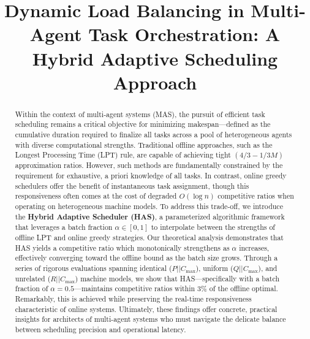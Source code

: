\documentclass[conference]{IEEEtran}
\begin{document}
\title{Dynamic Load Balancing in Multi-Agent Task Orchestration: A Hybrid Adaptive Scheduling Approach}

\author{
}

\maketitle

\begin{abstract}
Within the context of multi-agent systems (MAS), the pursuit of efficient task scheduling remains a critical objective for minimizing makespan---defined as the cumulative duration required to finalize all tasks across a pool of heterogeneous agents with diverse computational strengths. Traditional offline approaches, such as the Longest Processing Time (LPT) rule, are capable of achieving tight $(4/3 - 1/3M)$ approximation ratios. However, such methods are fundamentally constrained by the requirement for exhaustive, a priori knowledge of all tasks. In contrast, online greedy schedulers offer the benefit of instantaneous task assignment, though this responsiveness often comes at the cost of degraded $O(\log n)$ competitive ratios when operating on heterogeneous machine models. To address this trade-off, we introduce the \textbf{Hybrid Adaptive Scheduler (HAS)}, a parameterized algorithmic framework that leverages a batch fraction $\alpha \in [0,1]$ to interpolate between the strengths of offline LPT and online greedy strategies. Our theoretical analysis demonstrates that HAS yields a competitive ratio which monotonically strengthens as $\alpha$ increases, effectively converging toward the offline bound as the batch size grows. Through a series of rigorous evaluations spanning identical ($P||C_{\max}$), uniform ($Q||C_{\max}$), and unrelated ($R||C_{\max}$) machine models, we show that HAS---specifically with a batch fraction of $\alpha = 0.5$---maintains competitive ratios within 3\% of the offline optimal. Remarkably, this is achieved while preserving the real-time responsiveness characteristic of online systems. Ultimately, these findings offer concrete, practical insights for architects of multi-agent systems who must navigate the delicate balance between scheduling precision and operational latency.
\end{abstract}
\end{document}
